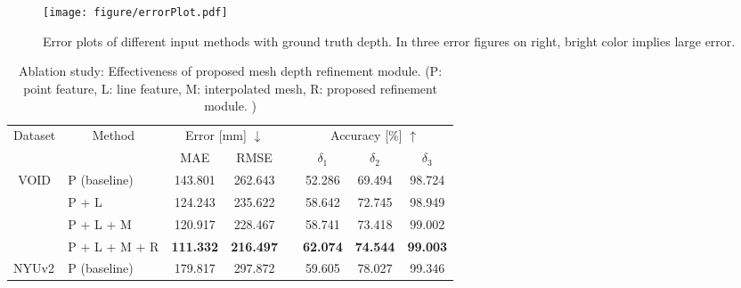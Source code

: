 \begin{figure}[t!]
\centering
    \texttt{[image: figure/errorPlot.pdf]}
    \caption{Error plot\textcolor{color1}{s} of different input method\textcolor{color1}{s} with ground truth depth. In three error figures on right, \textcolor{color1}{bright color implies large} error.} 
    \label{fig:error_plot}
    \vspace{-0.3cm}
\end{figure} 
\begin{table}[t!]
\centering
\renewcommand{\arraystretch}{1.1} \renewcommand{\tabcolsep}{1.1mm}  \caption{Ablation study: Effectiveness of \textcolor{color1}{p}roposed \textcolor{color1}{m}esh \textcolor{color1}{d}epth \textcolor{color1}{r}efinement module. 
(P: point feature, L: line feature, M: interpolated mesh, R: \textcolor{color1}{p}roposed refinement module.
)}
\begin{tabular}[ht]{clcccccc}
\hline
\multirow{2}{*}{Dataset}                   & \multicolumn{1}{c}{\multirow{2}{*}{Method}} & \multicolumn{2}{c}{Error {[}mm{]} $\downarrow$} &  & \multicolumn{3}{c}{Accuracy {[}\%{]} $\uparrow$}    \\ \cline{3-4} \cline{6-8} 
                                          & \multicolumn{1}{c}{}                        & MAE                    & RMSE                   &  & $\delta_1$      & $\delta_2$      & $\delta_3$      \\ \hline
\multirow{4}{*}{VOID}                      & P (baseline)                                & 143.801                & 262.643                &  & 52.286          & 69.494          & 98.724          \\
                                          & P + L                                       & 124.243                & 235.622                &  & 58.642          & 72.745          & 98.949          \\
                                          & P + L + M                                   & 120.917                & 228.467                &  & 58.741          & 73.418          & 99.002          \\
                                          & P + L + M + R                               & \textbf{111.332}       & \textbf{216.497}       &  & \textbf{62.074} & \textbf{74.544} & \textbf{99.003} \\ \hline
\multicolumn{1}{l}{\multirow{4}{*}{NYUv2}} & P (baseline)                                & 179.817                & 297.872                &  & 59.605          & 78.027          & 99.346          \\

\end{tabular}
\end{table}
